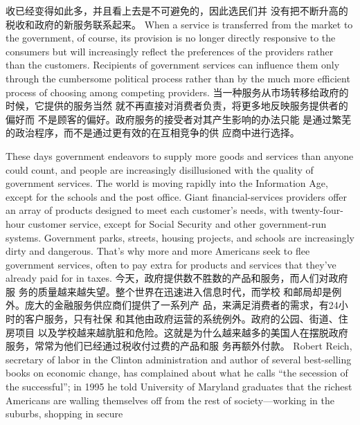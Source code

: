 \begin{paracol}{2}
收已经变得如此多，并且看上去是不可避免的，因此选民们并
没有把不断升高的税收和政府的新服务联系起来。
\switchcolumn*
When a service is transferred from the market to the government, of course, its provision is no longer directly responsive to
the consumers but will increasingly reflect the preferences of
the providers rather than the customers. Recipients of government services can influence them only through the cumbersome political process rather than by the much more efficient
process of choosing among competing providers.
\switchcolumn
当一种服务从市场转移给政府的时候，它提供的服务当然
就不再直接对消费者负责，将更多地反映服务提供者的偏好而
不是顾客的偏好。政府服务的接受者对其产生影响的办法只能
是通过繁芜的政治程序，而不是通过更有效的在互相竞争的供
应商中进行选择。

These days government endeavors to supply more goods and
services than anyone could count, and people are increasingly
disillusioned with the quality of government services. The
world is moving rapidly into the Information Age, except for
the schools and the post office. Giant financial-services
providers offer an array of products designed to meet each customer's needs, with twenty-four-hour customer service, except
for Social Security and other government-run systems. Government parks, streets, housing projects, and schools are increasingly dirty and dangerous. That's why more and more
Americans seek to flee government services, often to pay
extra for products and services that they've already paid for in
taxes.
\switchcolumn
今天，政府提供数不胜数的产品和服务，而人们对政府服
务的质量越来越失望。整个世界在迅速进入信息时代，而学校
和邮局却是例外。庞大的金融服务供应商们提供了一系列产
品，来满足消费者的需求，有24小时的客户服务，只有社保
和其他由政府运营的系统例外。政府的公园、街道、住房项目
以及学校越来越肮脏和危险。这就是为什么越来越多的美国人在摆脱政府服务，常常为他们已经通过税收付过费的产品和服
务再额外付款。
\switchcolumn*
Robert Reich, secretary of labor in the Clinton administration and author of several best-selling books on economic
change, has complained about what he calls ``the secession of
the successful''; in 1995 he told University of Maryland graduates that the richest Americans are walling themselves off from
the rest of society---working in the suburbs, shopping in secure

\end{paracol}
